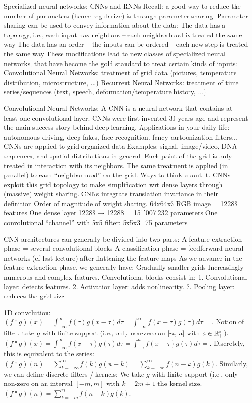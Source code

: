 Specialized neural networks: CNNs and RNNs Recall:
a good way to reduce the number of parameters (hence regularize) is through parameter sharing.
Parameter sharing can be used to convey information about the data:
The data has a topology, i.e., each input has neighbors – each neighborhood is treated the same way The data has an order – the inputs can be ordered – each new step is treated the same way
These modifications lead to new classes of specialized neural networks, that have become the gold standard to treat certain kinds of inputs:
Convolutional Neural Networks: treatment of grid data (pictures, temperature distribution, microstructure, ...)
Recurrent Neural Networks: treatment of time series/sequences (text, speech, deformation/temperature history, ...)

Convolutional Neural Networks:
A CNN is a neural network that contains at least one convolutional layer.
CNNs were first invented 30 years ago and represent the main success story behind deep learning. Applications in your daily life: autonomous driving, deep-fakes, face recognition, fancy cartoonization filters...
CNNs are applied to grid-organized data
Examples: signal, image/video, DNA sequences, and spatial distributions in general. 
Each point of the grid is only treated in interaction with its neighbors.
The same treatment is applied (in parallel) to each “neighborhood” on the grid.
Ways to think about it:
CNNs exploit this grid topology to make simplification wrt dense layers through (massive) weight sharing. CNNs integrate translation invariance in their definition
Order of magnitude of weight sharing.
64x64x3 RGB image = 12288 features
One dense layer 12288 → 12288 = 151’007’232 parameters
One convolutional “channel” with 5x5 filter: 5x5x3=75 parameters

CNN architectures can generally be divided into two parts:
A feature extraction phase = several convolutional blocks
A classification phase = feedforward neural networks (cf last lecture) after flattening the feature maps
As we advance in the feature extraction phase, we generally have: Gradually smaller grids
Increasingly numerous and complex features.
Convolutional blocks consist in:
1. Convolutional layer: detects features. 
2. Activation layer: adds nonlinearity.
3. Pooling layer: reduces the grid size.

1D convolution: $(f*g)(x)=\int_{-\infty}^{\infty} f(\tau) g(x-\tau) d\tau = \int_{-\infty}^{\infty} f(x-\tau) g(\tau) d\tau = $.
Notion of filter: take $g$ with finite support (i.e., only non-zero on [-a; a] with $a \in \mathbb{R}_+^*$):
$(f*g)(x)=\int_{-\infty}^{\infty} f(x-\tau) g(\tau) d\tau = \int_{-a}^{a} f(x-\tau) g(\tau) d\tau = $.
Discretely, this is equivalent to the series: 
$(f*g)(n)= \sum_{k=-\infty}^{\infty} f(k)g(n-k) =  \sum_{k=-\infty}^{\infty} f(n-k)g(k)$.
Similarly, we can define discrete filters / kernels:
We take $g$ with finite support (i.e., only non-zero on an interval $[-m,m]$ with $k=2m+1$ the kernel size. $(f*g)(n)= \sum_{k=-m}^{m} f(n-k)g(k)$.

